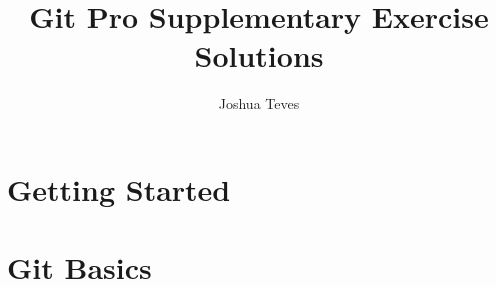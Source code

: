 \documentclass{book}
\title{Git Pro Supplementary Exercise Solutions}
\author{Joshua Teves}
\begin{document}
\maketitle

\chapter{Getting Started}


\chapter{Git Basics}

\end{document}
